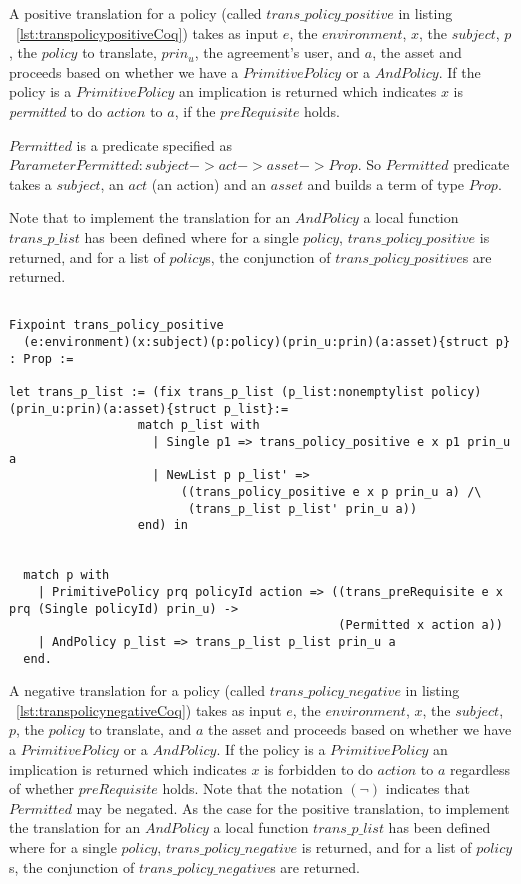 A positive translation for a policy (called $trans\_policy\_positive$ in listing ~\ref{lst:transpolicypositiveCoq}) takes as input $e$, the $environment$, $x$, the $subject$, $p$, the $policy$ to translate, $prin_{u}$, the agreement's user, and $a$, the asset and proceeds based on whether we have a $PrimitivePolicy$ or a $AndPolicy$. If the policy is a $PrimitivePolicy$ an implication is returned which indicates $x$ is \emph{permitted} to do $action$ to $a$, if the $preRequisite$ holds. 

$Permitted$ is a predicate specified as $Parameter Permitted : subject -> act -> asset -> Prop.$ So $Permitted$ predicate takes a $subject$, an $act$ (an action) and an $asset$ and builds a term of type $Prop$. 

Note that to implement the translation for an $AndPolicy$ a local function $trans\_p\_list$ has been defined where for a single $policy$, $trans\_policy\_positive$ is returned, and for a list of $policy$s, the conjunction of $trans\_policy\_positive$s are returned.

\begin{lstlisting}

Fixpoint trans_policy_positive
  (e:environment)(x:subject)(p:policy)(prin_u:prin)(a:asset){struct p} : Prop :=

let trans_p_list := (fix trans_p_list (p_list:nonemptylist policy)(prin_u:prin)(a:asset){struct p_list}:=
                  match p_list with
                    | Single p1 => trans_policy_positive e x p1 prin_u a
                    | NewList p p_list' => 
                        ((trans_policy_positive e x p prin_u a) /\ 
                         (trans_p_list p_list' prin_u a))
                  end) in


  match p with
    | PrimitivePolicy prq policyId action => ((trans_preRequisite e x prq (Single policyId) prin_u) ->
                                              (Permitted x action a))
    | AndPolicy p_list => trans_p_list p_list prin_u a
  end.
\end{lstlisting}

A negative translation for a policy (called $trans\_policy\_negative$ in listing ~\ref{lst:transpolicynegativeCoq}) takes as input $e$, the $environment$, $x$, the $subject$, $p$, the $policy$ to translate, and $a$ the asset and proceeds based on whether we have a $PrimitivePolicy$ or a $AndPolicy$. If the policy is a $PrimitivePolicy$ an implication is returned which indicates $x$ is forbidden to do $action$ to $a$ regardless of whether $preRequisite$ holds. Note that the notation $(\lnot)$ indicates that $Permitted$ may be negated. As the case for the positive translation, to implement the translation for an $AndPolicy$ a local function $trans\_p\_list$ has been defined where for a single $policy$, $trans\_policy\_negative$ is returned, and for a list of $policy$s, the conjunction of $trans\_policy\_negative$s are returned.


